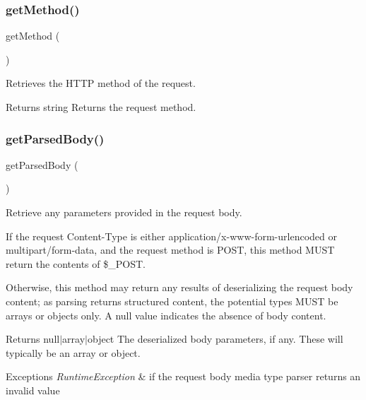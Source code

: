 \subsubsection{\texorpdfstring{get\+Method()}{getMethod()}}
{\footnotesize\ttfamily get\+Method (\begin{DoxyParamCaption}{ }\end{DoxyParamCaption})}

Retrieves the H\+T\+TP method of the request.

\begin{DoxyReturn}{Returns}
string Returns the request method. 
\end{DoxyReturn}
\mbox{\label{class_pes_1_1_http_1_1_request_adf5a4f6e03b33e876c065ca9a1409f38}} 
\subsubsection{\texorpdfstring{get\+Parsed\+Body()}{getParsedBody()}}
{\footnotesize\ttfamily get\+Parsed\+Body (\begin{DoxyParamCaption}{ }\end{DoxyParamCaption})}

Retrieve any parameters provided in the request body.

If the request Content-\/\+Type is either application/x-\/www-\/form-\/urlencoded or multipart/form-\/data, and the request method is P\+O\+ST, this method M\+U\+ST return the contents of \$\+\_\+\+P\+O\+ST.

Otherwise, this method may return any results of deserializing the request body content; as parsing returns structured content, the potential types M\+U\+ST be arrays or objects only. A null value indicates the absence of body content.

\begin{DoxyReturn}{Returns}
null$\vert$array$\vert$object The deserialized body parameters, if any. These will typically be an array or object. 
\end{DoxyReturn}

\begin{DoxyExceptions}{Exceptions}
{\em Runtime\+Exception} & if the request body media type parser returns an invalid value \\
\hline
\end{DoxyExceptions}
\mbox{\label{class_pes_1_1_http_1_1_request_ad6cfc3d6f17c43225f95e793da56b337}} 
